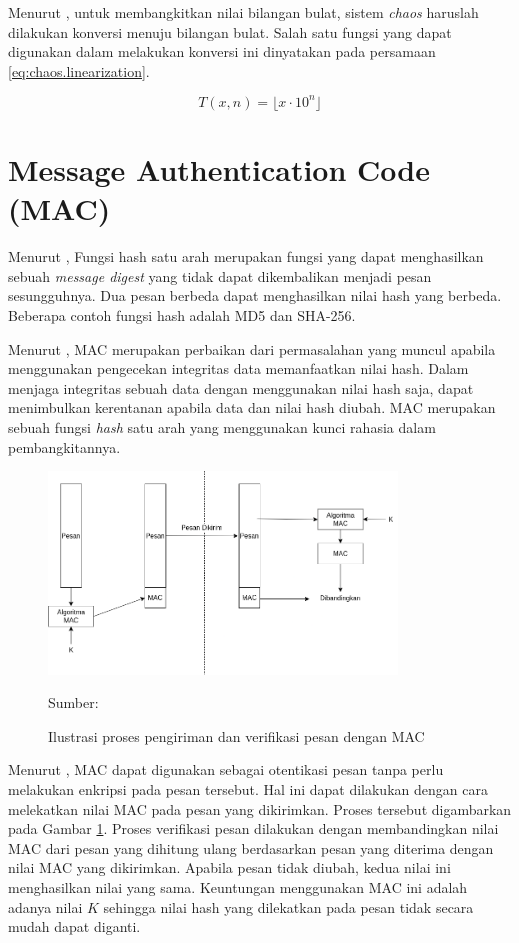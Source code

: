 Menurut \textcite{munir2019}, untuk membangkitkan nilai bilangan bulat, sistem \emph{chaos} haruslah dilakukan konversi menuju bilangan bulat. Salah satu fungsi yang dapat digunakan dalam melakukan konversi ini dinyatakan pada persamaan \ref{eq:chaos.linearization}.

\begin{equation}
  \label{eq:chaos.linearization}
  T(x, n) = \lfloor x \cdot 10^n \rfloor
\end{equation}

\section{Message Authentication Code (MAC)}
Menurut \textcite{munir2019}, Fungsi hash satu arah merupakan fungsi yang dapat menghasilkan sebuah \emph{message digest} yang tidak dapat dikembalikan menjadi pesan sesungguhnya. Dua pesan berbeda dapat menghasilkan nilai hash yang berbeda. Beberapa contoh fungsi hash adalah MD5 dan SHA-256.

Menurut \textcite{munir2019}, MAC merupakan perbaikan dari permasalahan yang muncul apabila menggunakan pengecekan integritas data memanfaatkan nilai hash. Dalam menjaga integritas sebuah data dengan menggunakan nilai hash saja, dapat menimbulkan kerentanan apabila data dan nilai hash diubah. MAC merupakan sebuah fungsi \emph{hash} satu arah yang menggunakan kunci rahasia dalam pembangkitannya.

\begin{figure}[!h]
  \centering
  \includegraphics[width=350px]{chapters/res/chapter-2/img/mac.png}
  \caption{Ilustrasi proses pengiriman dan verifikasi pesan dengan MAC} \label{fig:mac}
  Sumber: \textcite{munir2019}
\end{figure}

Menurut \textcite{munir2019}, MAC dapat digunakan sebagai otentikasi pesan tanpa perlu melakukan enkripsi pada pesan tersebut. Hal ini dapat dilakukan dengan cara melekatkan nilai MAC pada pesan yang dikirimkan. Proses tersebut digambarkan pada Gambar \ref{fig:mac}. Proses verifikasi pesan dilakukan dengan membandingkan nilai MAC dari pesan yang dihitung ulang berdasarkan pesan yang diterima dengan nilai MAC yang dikirimkan. Apabila pesan tidak diubah, kedua nilai ini menghasilkan nilai yang sama. Keuntungan menggunakan MAC ini adalah adanya nilai $K$ sehingga nilai hash yang dilekatkan pada pesan tidak secara mudah dapat diganti.


